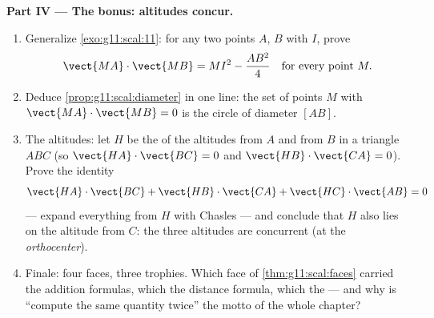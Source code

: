 \begin{problem}
\medskip
\noindent\textbf{Part IV --- The bonus: altitudes concur.}
\begin{enumerate}[resume]
  \item Generalize \cref{exo:g11:scal:11}: for any two points
        $A$, $B$ with  $I$, prove
        \[
        \vect{MA} \cdot \vect{MB} = MI^2 - \frac{AB^2}{4}
        \quad\text{for every point } M .
        \]
  \item Deduce \cref{prop:g11:scal:diameter} in one line: the
        set of points $M$ with
        $\vect{MA} \cdot \vect{MB} = 0$ is the circle of
        diameter $[AB]$.
  \item The altitudes: let $H$ be the  of the
        altitudes from $A$ and from $B$ in a triangle $ABC$
        (so $\vect{HA} \cdot \vect{BC} = 0$ and
        $\vect{HB} \cdot \vect{CA} = 0$). Prove the identity
        \[
        \vect{HA} \cdot \vect{BC} + \vect{HB} \cdot \vect{CA}
        + \vect{HC} \cdot \vect{AB} = 0
        \]
        --- expand everything from $H$ with Chasles --- and
        conclude that $H$ also lies on the altitude from $C$:
        the three altitudes are concurrent (at the
        \emph{orthocenter}).
  \item Finale: four faces, three trophies. Which face of
        \cref{thm:g11:scal:faces} carried the addition formulas,
        which the distance formula, which the  ---
        and why is ``compute the same quantity twice'' the motto
        of the whole chapter?
\end{enumerate}
\end{problem}
